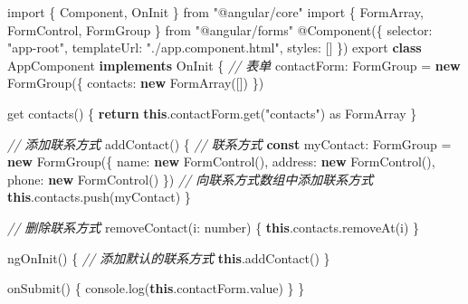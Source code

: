 \documentclass[
]{article}
\newenvironment{Shaded}{}{}
\newcommand{\AttributeTok}[1]{\textcolor[rgb]{0.49,0.56,0.16}{#1}}
\newcommand{\BuiltInTok}[1]{#1}
\newcommand{\CommentTok}[1]{\textcolor[rgb]{0.38,0.63,0.69}{\textit{#1}}}
\newcommand{\ControlFlowTok}[1]{\textcolor[rgb]{0.00,0.44,0.13}{\textbf{#1}}}
\newcommand{\DataTypeTok}[1]{\textcolor[rgb]{0.56,0.13,0.00}{#1}}
\newcommand{\FunctionTok}[1]{\textcolor[rgb]{0.02,0.16,0.49}{#1}}
\newcommand{\ImportTok}[1]{#1}
\newcommand{\KeywordTok}[1]{\textcolor[rgb]{0.00,0.44,0.13}{\textbf{#1}}}
\newcommand{\NormalTok}[1]{#1}
\newcommand{\OperatorTok}[1]{\textcolor[rgb]{0.40,0.40,0.40}{#1}}
\newcommand{\StringTok}[1]{\textcolor[rgb]{0.25,0.44,0.63}{#1}}
\begin{document}
\begin{Shaded}
\begin{Highlighting}[]
\ImportTok{import}\NormalTok{ \{ Component}\OperatorTok{,}\NormalTok{ OnInit \} }\ImportTok{from} \StringTok{"@angular/core"}
\ImportTok{import}\NormalTok{ \{ FormArray}\OperatorTok{,}\NormalTok{ FormControl}\OperatorTok{,}\NormalTok{ FormGroup \} }\ImportTok{from} \StringTok{"@angular/forms"}
\NormalTok{@}\FunctionTok{Component}\NormalTok{(\{}
  \DataTypeTok{selector}\OperatorTok{:} \StringTok{"app{-}root"}\OperatorTok{,}
  \DataTypeTok{templateUrl}\OperatorTok{:} \StringTok{"./app.component.html"}\OperatorTok{,}
  \DataTypeTok{styles}\OperatorTok{:}\NormalTok{ []}
\NormalTok{\})}
\ImportTok{export} \KeywordTok{class}\NormalTok{ AppComponent }\KeywordTok{implements}\NormalTok{ OnInit \{}
  \CommentTok{// 表单}
  \DataTypeTok{contactForm}\OperatorTok{:}\NormalTok{ FormGroup }\OperatorTok{=} \KeywordTok{new} \FunctionTok{FormGroup}\NormalTok{(\{}
    \DataTypeTok{contacts}\OperatorTok{:} \KeywordTok{new} \FunctionTok{FormArray}\NormalTok{([])}
\NormalTok{  \})}

\NormalTok{  get }\FunctionTok{contacts}\NormalTok{() \{}
    \ControlFlowTok{return} \KeywordTok{this}\OperatorTok{.}\AttributeTok{contactForm}\OperatorTok{.}\FunctionTok{get}\NormalTok{(}\StringTok{"contacts"}\NormalTok{) }\ImportTok{as}\NormalTok{ FormArray}
\NormalTok{  \}}

  \CommentTok{// 添加联系方式}
  \FunctionTok{addContact}\NormalTok{() \{}
    \CommentTok{// 联系方式}
    \KeywordTok{const} \DataTypeTok{myContact}\OperatorTok{:}\NormalTok{ FormGroup }\OperatorTok{=} \KeywordTok{new} \FunctionTok{FormGroup}\NormalTok{(\{}
      \DataTypeTok{name}\OperatorTok{:} \KeywordTok{new} \FunctionTok{FormControl}\NormalTok{()}\OperatorTok{,}
      \DataTypeTok{address}\OperatorTok{:} \KeywordTok{new} \FunctionTok{FormControl}\NormalTok{()}\OperatorTok{,}
      \DataTypeTok{phone}\OperatorTok{:} \KeywordTok{new} \FunctionTok{FormControl}\NormalTok{()}
\NormalTok{    \})}
    \CommentTok{// 向联系方式数组中添加联系方式}
    \KeywordTok{this}\OperatorTok{.}\AttributeTok{contacts}\OperatorTok{.}\FunctionTok{push}\NormalTok{(myContact)}
\NormalTok{  \}}

  \CommentTok{// 删除联系方式}
  \FunctionTok{removeContact}\NormalTok{(}\DataTypeTok{i}\OperatorTok{:}\NormalTok{ number) \{}
    \KeywordTok{this}\OperatorTok{.}\AttributeTok{contacts}\OperatorTok{.}\FunctionTok{removeAt}\NormalTok{(i)}
\NormalTok{  \}}

  \FunctionTok{ngOnInit}\NormalTok{() \{}
    \CommentTok{// 添加默认的联系方式}
    \KeywordTok{this}\OperatorTok{.}\FunctionTok{addContact}\NormalTok{()}
\NormalTok{  \}}

  \FunctionTok{onSubmit}\NormalTok{() \{}
    \BuiltInTok{console}\OperatorTok{.}\FunctionTok{log}\NormalTok{(}\KeywordTok{this}\OperatorTok{.}\AttributeTok{contactForm}\OperatorTok{.}\AttributeTok{value}\NormalTok{)}
\NormalTok{  \}}
\NormalTok{\}}
\end{Highlighting}
\end{Shaded}
\end{document}
